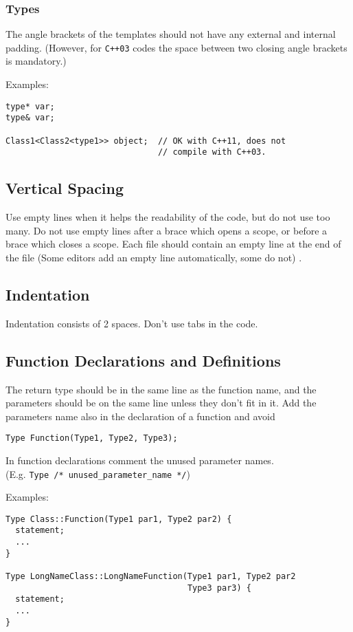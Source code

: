 \documentclass[a4paper]{article}
\newcommand{\inlinecode}[1]{\lstinline|#1|}
\begin{document}
\subsubsection{Types}

The angle brackets of the templates should not have any external and internal padding.
(However, for \texttt{C++03} codes the space between two closing angle brackets is mandatory.)

Examples:
\begin{lstlisting}
type* var;
type& var;

Class1<Class2<type1>> object;  // OK with C++11, does not
                               // compile with C++03.
\end{lstlisting}

\subsection{Vertical Spacing}

Use empty lines when it helps the readability of the code, but do not use too many.
Do not use empty lines after a brace which opens a scope,
or before a brace which closes a scope.
Each file should contain an empty line at the end of the file (Some editors add an empty line automatically, some do not) . 

\subsection{Indentation}

Indentation consists of 2 spaces. Don't use tabs in the code.

\subsection{Function Declarations and Definitions}

The return type should be in the same line as the function name, and the parameters should be on the same line unless they don't fit in it.
Add the parameters name also in the declaration of a function and avoid
\begin{lstlisting}
Type Function(Type1, Type2, Type3);
\end{lstlisting}
In function declarations comment the unused parameter names. \\(E.g. \inlinecode{Type /* unused_parameter_name */})

Examples:
\begin{lstlisting}
Type Class::Function(Type1 par1, Type2 par2) {
  statement;
  ...
}

Type LongNameClass::LongNameFunction(Type1 par1, Type2 par2
                                     Type3 par3) {
  statement;
  ...
}
\end{lstlisting}
\end{document}
